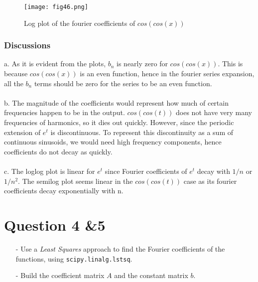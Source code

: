 \documentclass[11pt, a4paper, twoside]{article}
\begin{document}
	\begin{figure}[!tbh]
   	\centering
   	\texttt{[image: fig46.png]}   
   	\caption{Log plot of the fourier coefficients of $cos(cos(x))$}
   	\label{fig:sample}
   \end{figure} 


 \subsubsection{Discussions}
a. As it is evident from the plots, $b_n$ is nearly zero for $cos(cos(x))$. This is because $cos(cos(x))$ is an even function, hence in the fourier series expansion, all the $b_n$ terms should be zero for the series to be an even function.\\\\
b. The magnitude of the coefficients would represent how much of certain frequencies happen to be in the output. $cos(cos(t))$ does not have very many frequencies of harmonics, so it dies out quickly. However, since the periodic extension of $e^{t}$ is discontinuous. To represent this discontinuity as a sum of continuous sinusoids, we would need high frequency components, hence coefficients do not decay as quickly.\\\\
c. The loglog plot is linear for $e^{t}$ since Fourier coefficients of $e^{t}$ decay with $1/n$ or $1/n^{2}$. The semilog plot seems linear in the $cos(cos(t))$ case as its fourier coefficients decay exponentially with n.


        \section{Question 4 \&5}
            \begin{itemize}
                \item[-] Use a \textit{Least Squares} approach to find the Fourier coefficients of the functions, using \texttt{scipy.linalg.lstsq}.
                \item[-] Build the coefficient matrix $A$ and the constant matrix $b$.
            \end{itemize}
\end{document}
